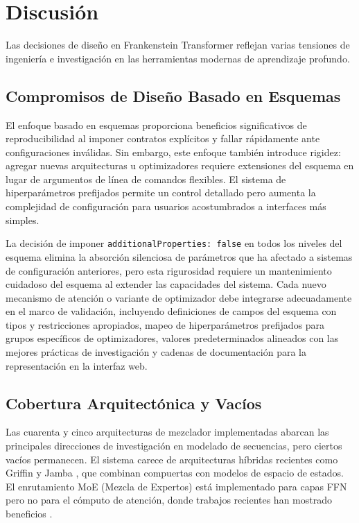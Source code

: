 \section{Discusión}
\label{sec:discussion}

Las decisiones de diseño en Frankenstein Transformer reflejan varias tensiones de ingeniería e investigación en las herramientas modernas de aprendizaje profundo.

\subsection{Compromisos de Diseño Basado en Esquemas}

El enfoque basado en esquemas proporciona beneficios significativos de reproducibilidad al imponer contratos explícitos y fallar rápidamente ante configuraciones inválidas. Sin embargo, este enfoque también introduce rigidez: agregar nuevas arquitecturas u optimizadores requiere extensiones del esquema en lugar de argumentos de línea de comandos flexibles. El sistema de hiperparámetros prefijados permite un control detallado pero aumenta la complejidad de configuración para usuarios acostumbrados a interfaces más simples.

La decisión de imponer \texttt{additionalProperties: false} en todos los niveles del esquema elimina la absorción silenciosa de parámetros que ha afectado a sistemas de configuración anteriores, pero esta rigurosidad requiere un mantenimiento cuidadoso del esquema al extender las capacidades del sistema. Cada nuevo mecanismo de atención o variante de optimizador debe integrarse adecuadamente en el marco de validación, incluyendo definiciones de campos del esquema con tipos y restricciones apropiados, mapeo de hiperparámetros prefijados para grupos específicos de optimizadores, valores predeterminados alineados con las mejores prácticas de investigación y cadenas de documentación para la representación en la interfaz web.

\subsection{Cobertura Arquitectónica y Vacíos}

Las cuarenta y cinco arquitecturas de mezclador implementadas abarcan las principales direcciones de investigación en modelado de secuencias, pero ciertos vacíos permanecen. El sistema carece de arquitecturas híbridas recientes como Griffin \citep{soares_griffin_2024} y Jamba \citep{gu_jamba_2024}, que combinan compuertas con modelos de espacio de estados. El enrutamiento MoE (Mezcla de Expertos) está implementado para capas FFN pero no para el cómputo de atención, donde trabajos recientes han mostrado beneficios \citep{lewis_moe_2021}.

